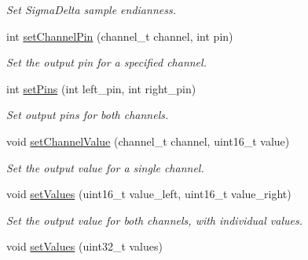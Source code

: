 \begin{DoxyCompactItemize}
\begin{DoxyCompactList}\small\item\em Set Sigma\-Delta sample endianness. \end{DoxyCompactList}\item 
\hypertarget{classSigmaDelta__class_a93d3d13e2a5ed7c633784bec4718a2a5}{int \hyperlink{classSigmaDelta__class_a93d3d13e2a5ed7c633784bec4718a2a5}{set\-Channel\-Pin} (channel\-\_\-t channel, int pin)}\label{classSigmaDelta__class_a93d3d13e2a5ed7c633784bec4718a2a5}

\begin{DoxyCompactList}\small\item\em Set the output pin for a specified channel. \end{DoxyCompactList}\item 
\hypertarget{classSigmaDelta__class_a78a3b71edf0d00ccd03b4c2bc2f2962d}{int \hyperlink{classSigmaDelta__class_a78a3b71edf0d00ccd03b4c2bc2f2962d}{set\-Pins} (int left\-\_\-pin, int right\-\_\-pin)}\label{classSigmaDelta__class_a78a3b71edf0d00ccd03b4c2bc2f2962d}

\begin{DoxyCompactList}\small\item\em Set output pins for both channels. \end{DoxyCompactList}\item 
\hypertarget{classSigmaDelta__class_a79f1cb6525227a87ce1a5328fb2aa3fc}{void \hyperlink{classSigmaDelta__class_a79f1cb6525227a87ce1a5328fb2aa3fc}{set\-Channel\-Value} (channel\-\_\-t channel, uint16\-\_\-t value)}\label{classSigmaDelta__class_a79f1cb6525227a87ce1a5328fb2aa3fc}

\begin{DoxyCompactList}\small\item\em Set the output value for a single channel. \end{DoxyCompactList}\item 
\hypertarget{classSigmaDelta__class_a7208ddf807e0eea26b6843874f7704c7}{void \hyperlink{classSigmaDelta__class_a7208ddf807e0eea26b6843874f7704c7}{set\-Values} (uint16\-\_\-t value\-\_\-left, uint16\-\_\-t value\-\_\-right)}\label{classSigmaDelta__class_a7208ddf807e0eea26b6843874f7704c7}

\begin{DoxyCompactList}\small\item\em Set the output value for both channels, with individual values. \end{DoxyCompactList}\item 
\hypertarget{classSigmaDelta__class_ad74b3f4ba5061dd55d9daa9f1de3538f}{void \hyperlink{classSigmaDelta__class_ad74b3f4ba5061dd55d9daa9f1de3538f}{set\-Values} (uint32\-\_\-t values)}\label{classSigmaDelta__class_ad74b3f4ba5061dd55d9daa9f1de3538f}


\end{DoxyCompactItemize}

